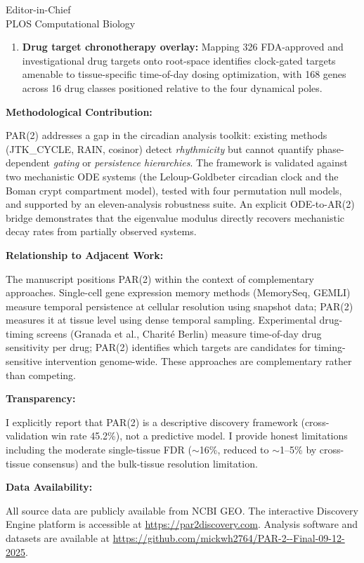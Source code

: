 \documentclass[11pt]{letter}
\begin{document}
\begin{letter}{Editor-in-Chief \\ PLOS Computational Biology}
\begin{enumerate}
    \item \textbf{Drug target chronotherapy overlay:} Mapping 326 FDA-approved and investigational drug targets onto root-space identifies clock-gated targets amenable to tissue-specific time-of-day dosing optimization, with 168 genes across 16 drug classes positioned relative to the four dynamical poles.
\end{enumerate}

\textbf{Methodological Contribution:}

PAR(2) addresses a gap in the circadian analysis toolkit: existing methods (JTK\_CYCLE, RAIN, cosinor) detect \textit{rhythmicity} but cannot quantify phase-dependent \textit{gating} or \textit{persistence hierarchies}. The framework is validated against two mechanistic ODE systems (the Leloup-Goldbeter circadian clock and the Boman crypt compartment model), tested with four permutation null models, and supported by an eleven-analysis robustness suite. An explicit ODE-to-AR(2) bridge demonstrates that the eigenvalue modulus directly recovers mechanistic decay rates from partially observed systems.

\textbf{Relationship to Adjacent Work:}

The manuscript positions PAR(2) within the context of complementary approaches. Single-cell gene expression memory methods (MemorySeq, GEMLI) measure temporal persistence at cellular resolution using snapshot data; PAR(2) measures it at tissue level using dense temporal sampling. Experimental drug-timing screens (Granada et al., Charit\'{e} Berlin) measure time-of-day drug sensitivity per drug; PAR(2) identifies which targets are candidates for timing-sensitive intervention genome-wide. These approaches are complementary rather than competing.

\textbf{Transparency:}

I explicitly report that PAR(2) is a descriptive discovery framework (cross-validation win rate 45.2\%), not a predictive model. I provide honest limitations including the moderate single-tissue FDR ($\sim$16\%, reduced to $\sim$1--5\% by cross-tissue consensus) and the bulk-tissue resolution limitation.

\textbf{Data Availability:}

All source data are publicly available from NCBI GEO. The interactive Discovery Engine platform is accessible at \url{https://par2discovery.com}. Analysis software and datasets are available at \url{https://github.com/mickwh2764/PAR-2--Final-09-12-2025}.


\end{letter}
\end{document}
